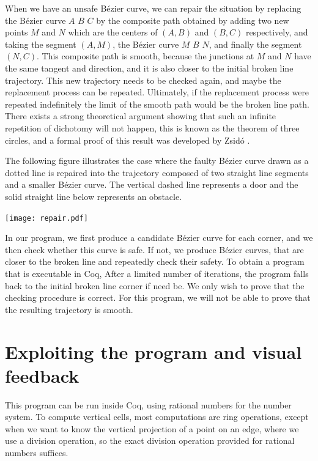 \documentclass{easychair}
\begin{document}
When we have an unsafe Bézier curve, we can repair the situation by
replacing the Bézier curve \(A\) \(B\) \(C\) by the composite path
obtained by adding two new points \(M\) and \(N\) which are the
centers of \((A,B)\) and \((B,C)\) respectively, and taking the
segment \((A,M)\), the Bézier curve \(M\) \(B\) \(N\), and finally the
segment \((N, C)\).  This composite path is smooth, because the
junctions at \(M\) and \(N\) have the same tangent and direction, and
it is also closer to the initial broken line trajectory.  
This new trajectory needs to be checked again,
and maybe the replacement process can be repeated.  Ultimately,
if the replacement process were repeated indefinitely the limit of the
smooth path would be the broken line path.  There exists a strong theoretical
argument showing that such an infinite repetition of dichotomy will not
happen, this is known as the theorem of three circles, and a formal proof
of this result was developed by Zsid\'o \cite{Zsido2014}.

The following figure illustrates the case where the faulty Bézier
curve drawn as a dotted line is repaired into the trajectory composed of two
straight line segments and a smaller Bézier curve.  The vertical
dashed line represents a door and the solid straight line below
represents an obstacle.

\begin{center}
\texttt{[image: repair.pdf]}
\end{center}

In our program, we first produce a candidate Bézier curve for each
corner, and we then check whether this curve is safe.  If not, we
produce Bézier curves, that are closer to the broken line and
repeatedly check their safety.  To obtain a program that is executable
in Coq, After a limited number of iterations,
the program falls back to the initial broken line corner if need be.
We only wish to prove that the checking procedure is correct.  For
this program, we will not be able to prove that the resulting trajectory
is smooth.

\section{Exploiting the program and visual feedback}
This program can be run inside Coq, using rational numbers for the
number system.  To compute vertical cells, most computations are ring
operations, except when we want to know the vertical projection of a
point on an edge, where we use a division operation, so the exact
division operation provided for rational numbers suffices.
\end{document}
